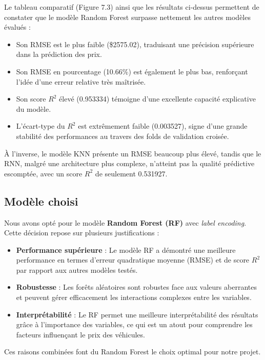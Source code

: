 \documentclass[12pt]{report}
\begin{document}
Le tableau comparatif (Figure 7.3) ainsi que les résultats ci-dessus permettent de constater que le modèle Random Forest surpasse nettement les autres modèles évalués :

\begin{itemize}
    \item Son RMSE est le plus faible (\$2575.02), traduisant une précision supérieure dans la prédiction des prix.
    \item Son RMSE en pourcentage (10.66\%) est également le plus bas, renforçant l'idée d'une erreur relative très maîtrisée.
    \item Son score \( R^2 \) élevé (0.953334) témoigne d'une excellente capacité explicative du modèle.
    \item L'écart-type du \( R^2 \) est extrêmement faible (0.003527), signe d'une grande stabilité des performances au travers des folds de validation croisée.
\end{itemize}

À l'inverse, le modèle KNN présente un RMSE beaucoup plus élevé, tandis que le RNN, malgré une architecture plus complexe, n'atteint pas la qualité prédictive escomptée, avec un score \( R^2 \) de seulement 0.531927.

\subsection{Modèle choisi}

Nous avons opté pour le modèle \textbf{Random Forest (RF)} avec \textit{label encoding}. Cette décision repose sur plusieurs justifications :

\begin{itemize}
    \item \textbf{Performance supérieure} : Le modèle RF a démontré une meilleure performance en termes d'erreur quadratique moyenne (RMSE) et de score \( R^2 \) par rapport aux autres modèles testés.
    \item \textbf{Robustesse} : Les forêts aléatoires sont robustes face aux valeurs aberrantes et peuvent gérer efficacement les interactions complexes entre les variables.
    \item \textbf{Interprétabilité} : Le RF permet une meilleure interprétabilité des résultats grâce à l'importance des variables, ce qui est un atout pour comprendre les facteurs influençant le prix des véhicules.
\end{itemize}

Ces raisons combinées font du Random Forest le choix optimal pour notre projet.
\end{document}
